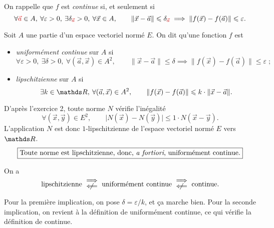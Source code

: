 \begin{rap}
	On rappelle que $f$\/ est \textit{continue} si, et seulement si \[
		\forall {\color{red}\vec{a}} \in A,\:\forall \varepsilon > 0,\: \exists \delta_{{\color{red}\vec{a}}} > 0,\:\forall \vec{x} \in A,\quad\quad \|\vec{x} - \vec{a}\| \leqslant \delta_{{\color{red}\vec{a}}} \implies \|f(\vec{x}) - f(\vec{a}) \|\leqslant \varepsilon
	.\]
\end{rap}

\begin{defn}
	Soit $A$\/ une partie d'un espace vectoriel normé $E$. On dit qu'une fonction $f$\/ est
	\begin{itemize}
		\item \textit{uniformément continue} sur $A$\/ si \[
				\forall \varepsilon > 0,\: \exists \delta > 0,\: \forall (\vec{a},\vec{x}) \in A^2,\quad\quad \|\vec{x} - \vec{a}\| \le \delta \implies \|f(\vec{x}) - f(\vec{a})\|\le \varepsilon\;
			;\]
		\item \textit{lipschitzienne} sur $A$\/ si \[
				\exists k \in \R,\: \forall (\vec{a},\vec{x}) \in A^2, \quad\quad \|f(\vec{x}) - f(\vec{a})\| \le k \cdot \|\vec{x} - \vec{a}\|
			.\]
	\end{itemize}
\end{defn}

\begin{exm}
	D'après l'exercice 2, toute norme $N$\/ vérifie l'inégalité \[
		\forall (\vec{x}, \vec{y}) \in E^2,\quad\quad \big|N(\vec{x}) - N(\vec{y})\big| \le 1\cdot  N(\vec{x} - \vec{y})
	.\]L'application $N$\/ est donc $1$-lipschitzienne de l'espace vectoriel normé $E$\/ vers $\R$. \[
		\boxed{\text{Toute norme est lipschitzienne, donc, \textit{a fortiori}, uniformément continue.}}
	\]
\end{exm}

\begin{prop}
	On a \[
		\text{lipschitzienne } \substack{\ds\implies\\ \ds\centernot{\impliedby}}
		\text{ uniformément continue } \substack{\ds\implies\\ \ds\centernot{\impliedby}}
		\text{ continue}
	.\] 
\end{prop}

\begin{prv}
	Pour la première implication, on pose $\delta = \varepsilon / k$, et ça marche bien.
	Pour la seconde implication, on revient à la définition de uniformément continue, ce qui vérifie la définition de continue.
\end{prv}

